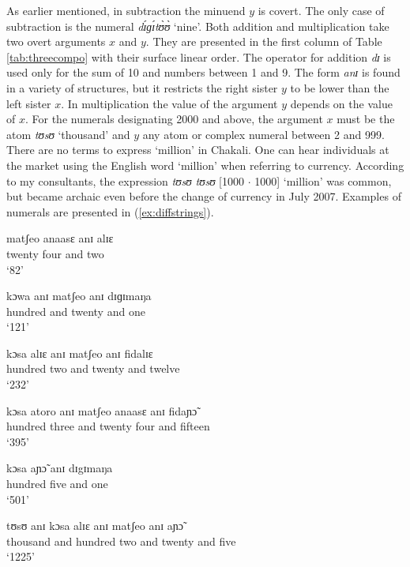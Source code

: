 \begin{exe}
\begin{exe}
\begin{exe}
{\begin{exe}
\begin{exe}
\begin{exe}
\begin{exe}
\begin{exe}
\begin{exe}
\begin{exe}
\begin{xlist}
\begin{exe}
\begin{exe}
\begin{exe}
As earlier mentioned, in subtraction  the minuend $y$ is covert. The only case
of subtraction 
is the numeral {\it dɪ́ɡɪ́tʊ̀ʊ̀} `nine'.  Both
addition  and multiplication take two overt arguments  $x$ and
$y$. They
are presented in the first column  of Table \ref{tab:threecompo} with their
surface linear order. The operator for addition {\it dɪ} is used only  for the
sum of 10 and numbers between 1 and 9. The form {\it anɪ} is found in a variety
of structures, but it restricts the right sister $y$ to be lower than the left
sister $x$. In multiplication  the value of the argument $y$ 
depends on the
value of $x$. For the numerals designating  2000 and above, the argument $x$
must be
the atom {\it tʊsʊ} `thousand' and $y$  any atom or complex numeral between 2 
and
999. There are no terms to express  `million' in Chakali. One can hear 
individuals at the
market  using the English word `million' when referring to  currency. According
to my consultants,  the expression {\it  tʊsʊ tʊsʊ} [1000 $\cdot$ 1000]
`million' was
common, but became archaic even before the change of currency  in July 
2007. Examples of numerals are presented in (\ref{ex:diffstrings}).


   



\ea\label{ex:diffstrings}
  \ea\label{ex:82}
\gll  matʃeo  anaasɛ anɪ  alɪɛ \\
      {twenty} {four} {and} {two}\\
\glt `82'

\ex\label{ex:121}
\gll  kɔwa  anɪ  matʃeo  anɪ   dɪɡɪmaŋa  \\
       {hundred}  {and}  {twenty}  {and}    {one}\\
\glt `121'

\ex\label{ex:232}
\gll  kɔsa  alɪɛ anɪ  matʃeo  anɪ fidalɪɛ\\
       {hundred}  {two}  {and}   {twenty}  {and}  {twelve}\\
\glt `232'

\ex\label{ex:395}
\gll kɔsa atoro anɪ matʃeo anaasɛ anɪ fidaɲɔ̃ \\
 {hundred} {three}  {and} {twenty}  {four} {and}  {fifteen}   \\
\glt `395'

\ex\label{ex:501}
\gll kɔsa  aɲɔ̃ anɪ  dɪgɪmaŋa\\
       {hundred} {five}  {and}  {one}  \\
\glt `501'

\ex\label{ex:1225}
\gll tʊsʊ  anɪ   kɔsa  alɪɛ   anɪ  matʃeo  anɪ  aɲɔ̃\\
       {thousand}  {and}  {hundred}  {two}  {and}  {twenty}  {and} {five}\\
\glt `1225'


\end{exe}
\end{exe}
\end{exe}
\end{xlist}
\end{exe}
\end{exe}
\end{exe}
\end{exe}
\end{exe}
\end{exe}
\end{exe}}
\end{exe}
\end{exe}
\end{exe}
